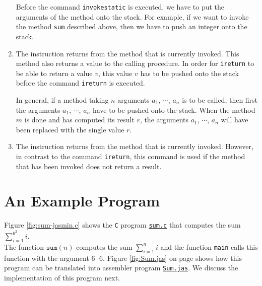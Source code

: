 \begin{enumerate}
      Before the command \texttt{invokestatic} is executed, we have to put the arguments of the method
      onto the stack.  For example, if we want to invoke the method \texttt{sum} described  above, then we
      have to push an integer onto the stack.
\item The instruction 
      returns from the method that is currently invoked.  This method also returns a value to the calling
      procedure.  In order for \texttt{ireturn} to be able to return a value $v$, this value $v$ has to be
      pushed onto the stack before the command \texttt{ireturn} is executed.

      In general, if a method taking $n$ arguments $a_1$, $\cdots$, $a_n$ is to be called, then first the
      arguments $a_1$, $\cdots$, $a_n$ have to be pushed onto the stack.  When the method $m$ is done and
      has computed its result $r$, the arguments $a_1$, $\cdots$, $a_n$ will have been replaced with the
      single value $r$.
\item The instruction 
      returns from the method that is currently invoked.  However, in contrast to the command
      \texttt{ireturn}, this command is used if the method that has been invoked  does not return a result. 
\end{enumerate}

\section{An Example Program}
Figure \ref{fig:sum-jasmin.c} shows the \texttt{C} program 
\href{https://github.com/karlstroetmann/Formal-Languages/tree/master/Jasmin/sum.c}{\texttt{sum.c}}
that computes the sum
\\[0.2cm]
\hspace*{1.3cm}
$\sum\limits_{i=1}^{6^2} i$.
\\[0.2cm]
The function $\mathtt{sum}(n)$ computes the sum $\sum_{i=1}^{n} i$ and the function
\texttt{main} calls this function with the argument $6 \cdot 6$.  Figure \ref{fig:Sum.jas} on page
\pageref{fig:Sum.jas} shows how this program can be translated 
into assembler program 
\href{https://github.com/karlstroetmann/Formal-Languages/tree/master/Jasmin/Sum.jas}{\texttt{Sum.jas}}.
We discuss the implementation of this program next. 


